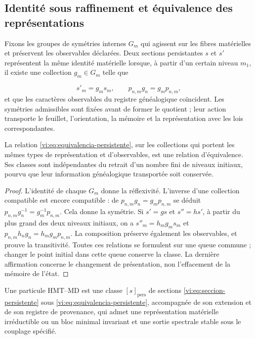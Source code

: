 \subsection{Identité sous raffinement et équivalence des représentations
}
\label{vi:subsec:identidad-material}

Fixons les groupes de symétries internes $G_m$ qui agissent sur les fibres
matérielles et préservent les observables déclarées. Deux sections
persistantes $s$ et $s'$ représentent la même identité matérielle lorsque,
à partir d’un certain niveau $m_1$, il existe une collection $g_m\in G_m$ telle que

\begin{equation}
 s'_m=g_ms_m,\qquad
 p_{n,m}g_n=g_mp_{n,m},
 \label{vi:eq:equivalencia-persistente}
\end{equation}
et que les caractères observables du registre généalogique coïncident. Les
symétries admissibles sont fixées avant de former le quotient ; leur action
transporte le feuillet, l’orientation, la mémoire et la représentation avec
les lois correspondantes.


\begin{proposition}
\label{vi:prop:equivalencia-persistente}
La relation \eqref{vi:eq:equivalencia-persistente}, sur les collections qui
portent les mêmes types de représentation et d’observables, est une relation
d’équivalence. Ses classes sont indépendantes du retrait d’un nombre
fini de niveaux initiaux, pourvu que leur information
généalogique transportée soit conservée.

\end{proposition}
\begin{proof}
L’identité de chaque $G_m$ donne la réflexivité. L’inverse d’une collection
compatible est encore compatible : de
$p_{n,m}g_n=g_mp_{n,m}$ se déduit
$p_{n,m}g_n^{-1}=g_m^{-1}p_{n,m}$. Cela donne la symétrie.
Si $s'=gs$ et $s''=hs'$, à partir du plus grand des deux niveaux initiaux,
on a $s''_m=h_mg_ms_m$ et
$p_{n,m}h_ng_n=h_mg_mp_{n,m}$. La composition préserve également les
observables, et prouve la transitivité. Toutes ces relations se formulent
sur une queue commune ; changer le point initial dans cette queue
conserve la classe. La dernière affirmation concerne le changement de
présentation, non l’effacement de la mémoire de l’état.

\end{proof}

\begin{definition}
\label{vi:def:particula}
Une particule HMT--MD est une classe $[s]_{\mathrm{pers}}$ de sections
\eqref{vi:eq:seccion-persistente} sous
\eqref{vi:eq:equivalencia-persistente}, accompagnée de son extension et de son
registre de provenance, qui admet une représentation matérielle
irréductible ou un bloc minimal invariant et une sortie spectrale stable
sous le couplage spécifié.

\end{definition}

